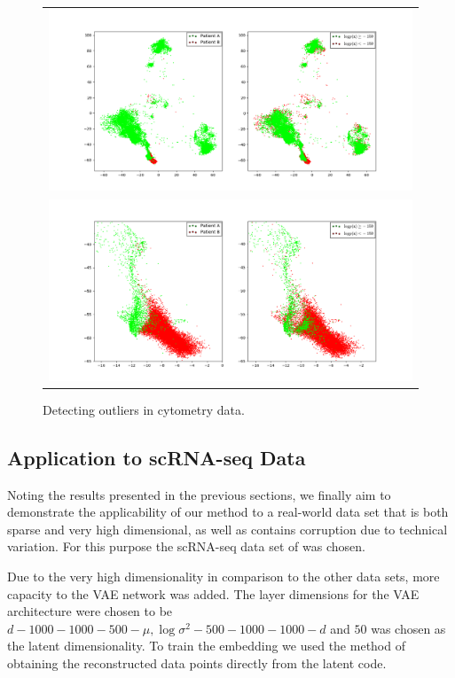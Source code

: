 \begin{figure}[!htb]
  \centering
  \begin{tabular}{c}
    \includegraphics[width=\textwidth]{images/scored.png} \\
    \includegraphics[width=\textwidth]{images/scored_zoomed.png}
  \end{tabular}
  \caption{Detecting outliers in cytometry data.}
  \label{fig:cytometry_outliers}
\end{figure}

\subsection{Application to scRNA-seq Data}
\label{section:application_to_scrna}

Noting the results presented in the previous sections, we finally aim to demonstrate the applicability of our method to a real-world data set that is both sparse and very high dimensional, as well as contains corruption due to technical variation. For this purpose the scRNA-seq data set of \cite{tirosh} was chosen.

Due to the very high dimensionality in comparison to the other data sets, more capacity to the VAE network was added. The layer dimensions for the VAE architecture were chosen to be $d - 1000 - 1000 - 500 - \mu, \log \sigma^2 - 500 - 1000 - 1000 - d$ and $50$ was chosen as the latent dimensionality. To train the embedding we used the method of obtaining the reconstructed data points directly from the latent code.

